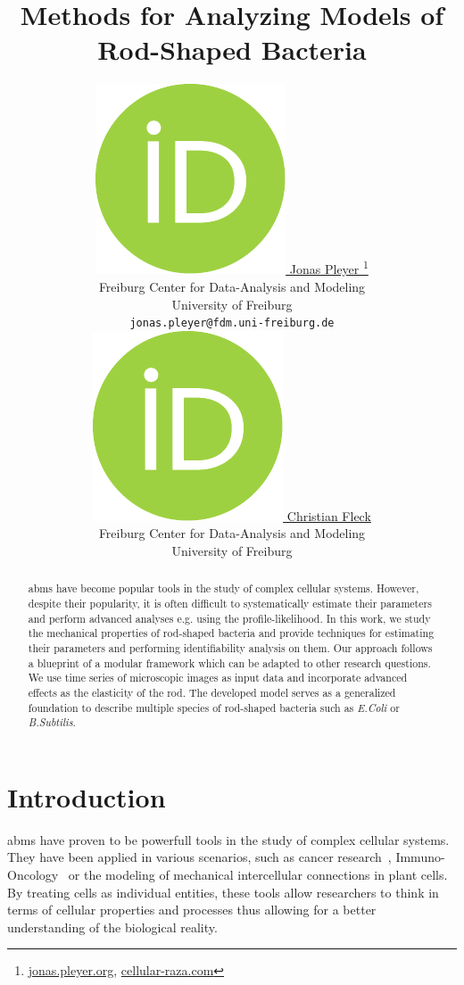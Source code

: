 \documentclass{article}
\title{Methods for Analyzing Models of\\ Rod-Shaped Bacteria}
\author{
    \href{https://orcid.org/0009-0001-0613-7978}{
        \includegraphics[scale=0.06]{figures/orcid.pdf}
        \hspace{1mm}Jonas Pleyer
    }
    \thanks{
        \href{https://jonas.pleyer.org}{jonas.pleyer.org},
        \href{https://cellular-raza.com}{cellular-raza.com}
    }\\
	Freiburg Center for Data-Analysis and Modeling\\
	University of Freiburg\\
	\texttt{jonas.pleyer@fdm.uni-freiburg.de} \\
	\And
	\href{https://orcid.org/0000-0002-6371-4495}{
        \includegraphics[scale=0.06]{figures/orcid.pdf}
        \hspace{1mm}Christian Fleck
    }\\
	Freiburg Center for Data-Analysis and Modeling\\
	University of Freiburg
}
\begin{document}
\maketitle


\begin{abstract}
    \aclp{abm} have become popular tools in the study of complex cellular systems.
    However, despite their popularity, it is often difficult to systematically estimate their
    parameters and perform advanced analyses e.g. using the profile-likelihood.
    In this work, we study the mechanical properties of rod-shaped bacteria and provide techniques
    for estimating their parameters and performing identifiability analysis on them.
    Our approach follows a blueprint of a modular framework which can be adapted to other research
    questions.
    We use time series of microscopic images as input data and incorporate advanced effects as the
    elasticity of the rod.
    The developed model serves as a generalized foundation to describe multiple species of
    rod-shaped bacteria such as \textit{E.Coli} or \textit{B.Subtilis}.
\end{abstract}


\pagebreak
\renewcommand{\contentsname}{Table of Contents (remove before submission)}
\tableofcontents
\vfill
\pagebreak

\section{Introduction}

\acp{abm} have proven to be powerfull tools in the study of complex cellular systems.
They have been applied in various scenarios, such as cancer
research~\cite{Ghaffarizadeh2018,Cooper2020}, Immuno-Oncology~\cite{Karolak2021} or the modeling
of mechanical intercellular connections in plant cells.
By treating cells as individual entities, these tools allow researchers to think in terms of
cellular properties and processes thus allowing for a better understanding of the biological
reality.
\end{document}
